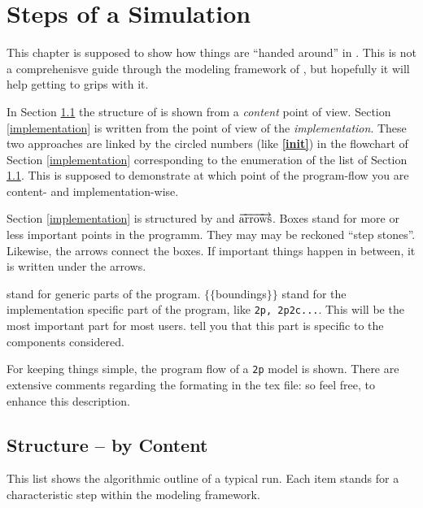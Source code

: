 \section{Steps of a \Dumux Simulation}
\label{flow}

This chapter is supposed to show how things are ``handed around'' in \Dumux. This
is not a comprehenisve guide through the modeling framework of \Dumux, but
hopefully it will help getting to grips with it.

In Section \ref{content} the structure of \Dumux is shown from a \emph{content}
point of view.
Section \ref{implementation} is written from the point of view of the \emph{implementation}.
These two approaches are linked by the circled numbers (like \textbf{\textcircled{\ref{init}}})
in the flowchart of Section \ref{implementation} corresponding to the enumeration
of the list of Section \ref{content}. This is supposed to demonstrate at which point
of the program-flow you are content- and implementation-wise.

Section \ref{implementation} is structured by  and
$\overrightarrow{\textnormal{arrows}}$. Boxes stand for more or less important
points in the programm. They may may be reckoned ``step stones''. Likewise, the
arrows connect the boxes. If important things happen in between, it is written
under the arrows.

 stand for generic parts of the program. 
$\lbrace\lbrace$boundings$\rbrace\rbrace$ stand for the implementation specific
part of the program, like \verb+2p, 2p2c...+. This will be the most important
part for most users.  tell you that this part is specific
to the components considered.

For keeping things simple, the program flow of a \verb+2p+ model is shown.
There are extensive comments regarding the formating in the tex file: so feel free,
to enhance this description.

\subsection{Structure -- by Content}

\label{content}
This list shows the algorithmic outline of a typical \Dumux run. Each item stands
for a characteristic step within the modeling framework.

